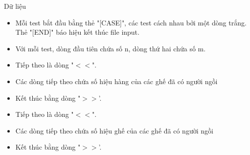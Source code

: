 Dữ liệu
\begin{itemize}
	\item     Mỗi test bắt đầu bằng thẻ "[CASE]", các test cách nhau bởi một dòng trắng. Thẻ "[END]" báo hiệu kết thúc file input.   
	\item     Với mỗi test, dòng đầu tiên chứa số n, dòng thứ hai chứa số m.   
	\item     Tiếp theo là dòng "$<$$<$".   
	\item     Các dòng tiếp theo chứa số hiệu hàng của các ghế đã có người ngồi   
	\item     Kết thúc bằng dòng "$>$$>$'.   
	\item     Tiếp theo là dòng "$<$$<$".   
	\item     Các dòng tiếp theo chứa số hiệu ghế của các ghế đã có người ngồi   
	\item     Kết thúc bằng dòng "$>$$>$'.   
\end{itemize}